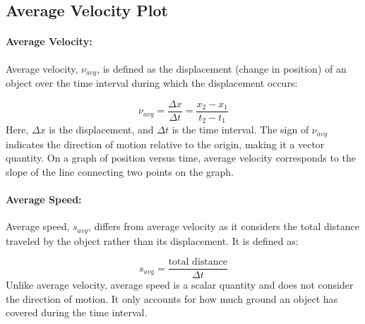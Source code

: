 \documentclass{article}
\begin{document}
\begin{center}
\section*{Average Velocity Plot}
\end{center}

\paragraph{Average Velocity:}
Average velocity, $\nu_{avg}$, is defined as the displacement (change in position) of an object over the time interval during which the displacement occurs:

\[
\nu_{avg} = \frac{\Delta x}{\Delta t} = \frac{x_2 - x_1}{t_2 - t_1}
\]
Here, $\Delta x$ is the displacement, and $\Delta t$ is the time interval. The sign of $\nu_{avg}$ indicates the direction of motion relative to the origin, making it a vector quantity. On a graph of position versus time, average velocity corresponds to the slope of the line connecting two points on the graph.

\paragraph{Average Speed:}
Average speed, $s_{avg}$, differs from average velocity as it considers the total distance traveled by the object rather than its displacement. It is defined as:

\[
s_{avg} = \frac{\text{total distance}}{\Delta t}
\]
Unlike average velocity, average speed is a scalar quantity and does not consider the direction of motion. It only accounts for how much ground an object has covered during the time interval.
\end{document}
